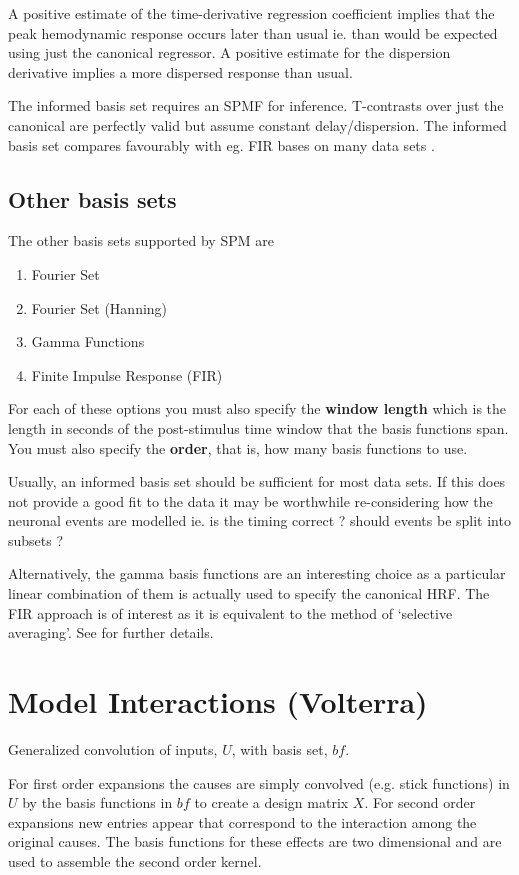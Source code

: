 A positive estimate of the time-derivative regression coefficient implies that the peak 
hemodynamic response occurs later than usual ie. than
would be expected using just the canonical regressor. 
A positive estimate for the dispersion derivative implies
a more dispersed response than usual.

The informed basis set requires an SPM{F} for inference. T-contrasts over just the canonical are perfectly valid but assume constant delay/dispersion. The informed basis set compares favourably with eg. FIR bases on many data sets \cite{rnah_basis}.

\subsection{Other basis sets}

The other basis sets supported by SPM are
\begin{enumerate}

\item{Fourier Set}
\item{Fourier Set (Hanning)}
\item{Gamma Functions}
\item{Finite Impulse Response (FIR)}
\end{enumerate}

For each of these options you must also specify the 
{\bf window length} which is the length in seconds of the 
post-stimulus time window that the basis functions 
span. You must also specify the {\bf order}, that is, how many
basis functions to use.

Usually, an informed basis set should be sufficient for 
most data sets. If this does not provide a good fit to the 
data it may be worthwhile re-considering how the neuronal events
are modelled ie. is the timing correct ? should events be split into 
subsets ? 

Alternatively, the gamma basis functions are an interesting choice 
as a particular linear combination of them is actually used to 
specify the canonical HRF. The FIR approach is of interest as it 
is equivalent to the method of `selective averaging'. See 
\cite{rnah_conv} for further details. 

\section{Model Interactions (Volterra)}
Generalized convolution of inputs, $U$, with basis set, $bf$.

For first order expansions the causes are simply convolved (e.g. stick functions) in $U$ by the basis functions in $bf$ to create a design matrix $X$.  For second order expansions new entries appear that correspond to the interaction among the original causes. The basis functions for these effects are two dimensional and are used to assemble the second order kernel. 

